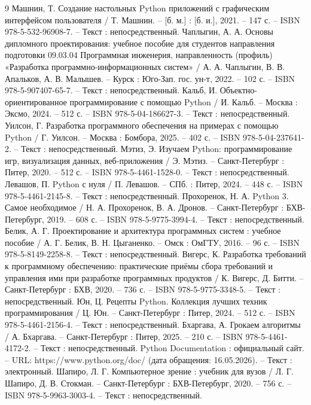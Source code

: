 \begin{thebibliography}{9}
	 Машнин, Т. Создание настольных Python приложений с графическим интерфейсом пользователя / Т. Машнин. -- [б. м.] : [б. и.], 2021. -- 147 с. -- ISBN 978-5-532-96908-7. -- Текст : непосредственный.
	 Чаплыгин, А. А. Основы дипломного проектирования: учебное пособие для студентов направления подготовки 09.03.04 Программная инженерия, направленность (профиль) «Разработка программно-информационных систем» / А. А. Чаплыгин, В. В. Апальков, А. В. Малышев. -- Курск : Юго-Зап. гос. ун-т, 2022. -- 102 с. -- ISBN 978-5-907407-65-7. -- Текст : непосредственный.
	 Кальб, И. Объектно-ориентированное программирование с помощью Python / И. Кальб. -- Москва : Эксмо, 2024. -- 512 с. -- ISBN 978-5-04-186627-3. -- Текст : непосредственный.
	 Уилсон, Г. Разработка программного обеспечения на примерах с помощью Python / Г. Уилсон. -- Москва : Бомбора, 2025. -- 402 с. -- ISBN 978-5-04-237641-2. -- Текст : непосредственный.
	 Мэтиз, Э. Изучаем Python: программирование игр, визуализация данных, веб-приложения / Э. Мэтиз. -- Санкт-Петербург : Питер, 2020. -- 512 с. -- ISBN 978-5-4461-1528-0. -- Текст : непосредственный.
	 Левашов, П. Python с нуля / П. Левашов. -- СПб. : Питер, 2024. -- 448 с. -- ISBN 978-5-4461-2145-8. -- Текст : непосредственный.
	 Прохоренок, Н. А. Python 3. Самое необходимое / Н. А. Прохоренок, В. А. Дронов. -- Санкт-Петербург : БХВ-Петербург, 2019. -- 608 с. -- ISBN 978-5-9775-3994-4. -- Текст : непосредственный.
	 Белик, А. Г. Проектирование и архитектура программных систем : учебное пособие / А. Г. Белик, В. Н. Цыганенко. -- Омск : ОмГТУ, 2016. -- 96 с. -- ISBN 978-5-8149-2258-8. -- Текст : непосредственный.
	 Вигерс, К. Разработка требований к программному обеспечению: практические приёмы сбора требований и управления ими при разработке программных продуктов / К. Вигерс, Д. Битти. -- Санкт-Петербург : БХВ, 2020. -- 736 с. -- ISBN 978-5-9775-3348-5. -- Текст : непосредственный.
	 Юн, Ц. Рецепты Python. Коллекция лучших техник программирования / Ц. Юн. -- Санкт-Петербург : Питер, 2024. -- 512 с. -- ISBN 978-5-4461-2156-4. -- Текст : непосредственный.
	 Бхаргава, А. Грокаем алгоритмы / А. Бхаргава. -- Санкт-Петербург : Питер, 2025. -- 210 с. -- ISBN 978-5-4461-4172-2. -- Текст : непосредственный.
	 Python Documentation : официальный сайт. -- URL: https://www.python.org/doc/ (дата обращения: 16.05.2026). -- Текст : электронный.
	 Шапиро, Л. Г. Компьютерное зрение : учебник для вузов / Л. Г. Шапиро, Д. В. Стокман. -- Санкт-Петербург : БХВ-Петербург, 2020. -- 756 с. -- ISBN 978-5-9963-3003-4. -- Текст : непосредственный.

\end{thebibliography}
